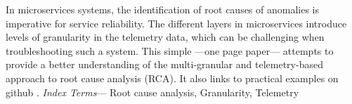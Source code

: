 In microservices systems, the identification of root causes of anomalies is imperative for service reliability. The different layers in microservices introduce levels of granularity in the telemetry data, which can be challenging when troubleshooting such a system. This simple ---one page paper--- attempts to provide a better understanding of the multi-granular and telemetry-based approach to root cause analysis (RCA). It also links to practical examples on github \cite{Github}.
\emph{Index Terms}--- Root cause analysis, Granularity, Telemetry